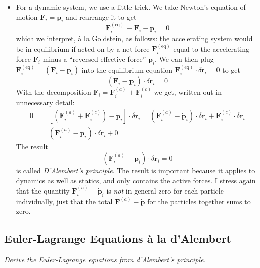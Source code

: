 \documentclass[11pt, a4paper]{article}
\newcommand{\bdot}[1]{\dot{\bm{#1}}}
\begin{document}
\begin{itemize}
	\item For a dynamic system, we use a little trick. We take Newton's equation of motion $ \bm{F}_{i} = \bdot{p}_{i} $ and rearrange it to get
	\begin{equation*}
		\bm{F}_{i}^{(\text{eq})} \equiv \bm{F}_{i} - \bdot{p}_{i} = 0
	\end{equation*}
	which we interpret, \`{a} la Goldstein, as follows: the accelerating system would be in equilibrium if acted on by a net force $ \bm{F}_{i}^{(\text{eq})} $ equal to the accelerating force $ \bm{F}_{i} $ minus a ``reversed effective force'' $ \bdot{p}_{i} $. We can then plug $\bm{F}_{i}^{(\text{eq})} = \left(\bm{F}_{i} - \bdot{p}_{i}\right) $ into the equilibrium equation $ \bm{F}_{i}^{(\text{eq})} \cdot \delta \bm{r}_{i} = 0 $ to get
	\begin{equation*}
		\left(\bm{F}_{i} - \bdot{p}_{i}\right) \cdot \delta \bm{r}_{i} = 0
	\end{equation*}
	With the decomposition $ \bm{F}_{i} = \bm{F}_{i}^{(a)} + \bm{F}_{i}^{(c)} $ we get, written out in unnecessary detail:
	\begin{align*}
		0 &= \left[ \left(\bm{F}_{i}^{(a)} + \bm{F}_{i}^{(c)}\right) - \bdot{p}_{i}\right] \cdot \delta \bm{r}_{i} = \left( \bm{F}_{i}^{(a)} - \bdot{p}_{i}\right) \cdot \delta \bm{r}_{i} + \bm{F}_{i}^{(c)}\cdot \delta \bm{r}_{i} \\
		&= \left( \bm{F}_{i}^{(a)} - \bdot{p}_{i}\right) \cdot \delta \bm{r}_{i} + 0
	\end{align*}
	The result
	\begin{equation*}
		\left( \bm{F}_{i}^{(a)} - \bdot{p}_{i}\right) \cdot \delta \bm{r}_{i}= 0
	\end{equation*}
	is called \textit{D'Alembert's principle}. The result is important because it applies to dynamics as well as statics, and only contains the active forces. I stress again that the quantity $ \bm{F}_{i}^{(a)} - \bdot{p}_{i} $ is \textit{not} in general zero for each particle individually, just that the total $ \bm{F}^{(a)} - \bdot{p} $ for the particles together sums to zero.
	
\end{itemize}

\subsection{Euler-Lagrange Equations \`{a} la d'Alembert}
\textit{Derive the Euler-Lagrange equations from d'Alembert's principle.}
\end{document}
